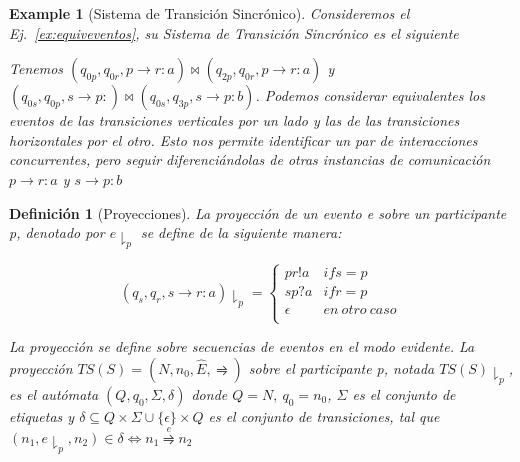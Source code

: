 \documentclass[paper=a4, fontsize=11pt, spanish]{scrartcl} %
\numberwithin{equation}{section} %
\numberwithin{figure}{section} %
\numberwithin{table}{section} %
\newtheorem{example}{Example}
\newtheorem{definition}{Definición}
\begin{document}
\begin{example}[Sistema de Transición Sincrónico] 
\label{ex:STS}
Consideremos el Ej.~\ref{ex:equiveventos}, su Sistema de Transición Sincrónico es el siguiente


Tenemos $(q_{0p}, q_{0r}, p \rightarrow r:a) \bowtie (q_{2p}, q_{0r}, p \rightarrow r:a)$ y $(q_{0s}, q_{0p}, s \rightarrow p:) \bowtie (q_{0s}, q_{3p}, s \rightarrow p:b)$. Podemos considerar equivalentes los eventos de las transiciones verticales por un lado y las de las transiciones horizontales por el otro. Esto nos permite identificar un par de interacciones concurrentes, pero seguir diferenciándolas de otras instancias de comunicación $p \rightarrow r:a$ y $s \rightarrow p:b$
\end{example}

\begin{definition}[Proyecciones] La proyección de un evento e sobre un participante p, denotado por $e \downharpoonright_p$ se define de la siguiente manera:

\begin{equation}
(q_s,q_r,s \rightarrow r:a) \downharpoonright_p = \begin{cases} 
pr!a & \mathit{if} s=p \\
sp?a & \mathit{if} r=p \\
\epsilon & \mathit{en \ otro \ caso} \\
\end{cases} 
\end{equation}

La proyección se define sobre secuencias de eventos en el modo evidente. La proyección $TS(S)= (N, n_0, \hat{E}, \rightrightharpoons)$ sobre el participante p, notada $ TS(S) \downharpoonright_p $, es el autómata $(Q, q_0, \Sigma, \delta)$ donde $Q=N, \ q_0 = n_0$, $\Sigma$ es el conjunto de etiquetas y $\delta \subseteq Q \times \Sigma \cup \{ \epsilon \} \times Q $ es el conjunto de transiciones, tal que $(n_1, e \downharpoonright_p, n_2) \in \delta \iff n_1 \overset{e}{\rightrightharpoons} n_2 $

\end{definition}
\end{document}
